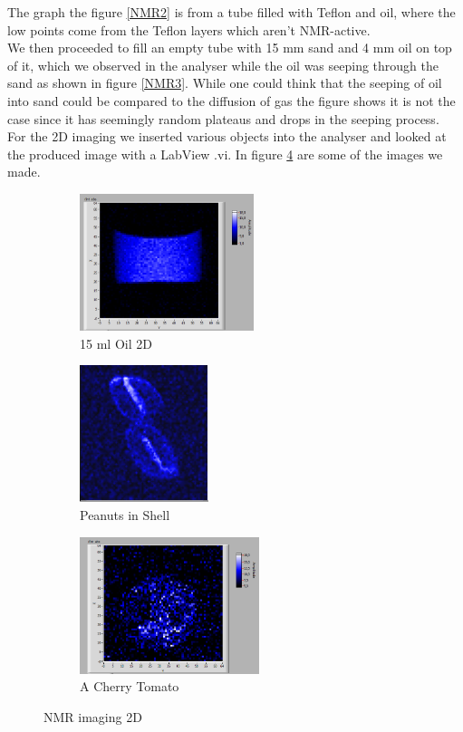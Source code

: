 The graph the figure \ref{NMR2} is from a tube filled with Teflon and oil, where the low points come from the Teflon layers which aren't NMR-active. \\
We then proceeded to fill an empty tube with 15 mm sand and 4 mm oil on top of it, which we observed in the analyser while the oil was seeping through the sand as shown in figure \ref{NMR3}. While one could think that the seeping of oil into sand could be compared to the diffusion of gas the figure shows it is not the case since it has seemingly random plateaus and drops in the seeping process. \\
For the 2D imaging we inserted various objects into the analyser and looked at the produced image with a LabView .vi. In figure \ref{2DNMR} are some of the images we made.
\begin{figure}[h]
	\begin{subfigure}{0.32\textwidth}
	\includegraphics[width=0.9\linewidth ,height=4cm]{2d_image/Oil_Vertical_15_2.png}
	\caption{15 ml Oil 2D}
	\label{2DNMR1}
	\end{subfigure}
	\begin{subfigure}{0.32\textwidth}
	\includegraphics[width=0.9\linewidth ,height=4cm]{2d_image/peanut_5avg_2_3d.png}
	\caption{Peanuts in Shell}
	\label{2DNMR2}
	\end{subfigure}
	\begin{subfigure}{0.32\textwidth}
	\includegraphics[width=0.9\linewidth, height=4cm]{2d_image/tomato_2.png}
	\caption{A Cherry Tomato}
	\label{2DNMR3}
	\end{subfigure}
	\caption{NMR imaging 2D}
	\label{2DNMR}
\end{figure}
